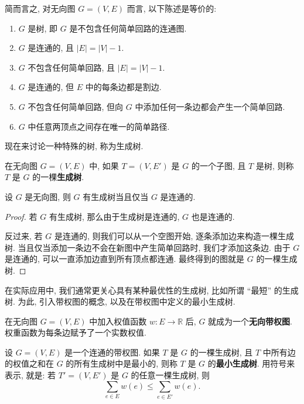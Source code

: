简而言之, 对无向图 $G=(V,E)$ 而言, 以下陈述是等价的:
\begin{enumerate}[itemindent=0ex, itemsep=0pt, label=\upshape{(\alph*)}]
    \item $G$ 是树, 即 $G$ 是不包含任何简单回路的连通图.
    \item $G$ 是连通的, 且 $|E|=|V|-1$.
    \item $G$ 不包含任何简单回路, 且 $|E|=|V|-1$.
    \item $G$ 是连通的, 但 $E$ 中的每条边都是割边.
    \item $G$ 不包含任何简单回路, 但向 $G$ 中添加任何一条边都会产生一个简单回路.
    \item $G$ 中任意两顶点之间存在唯一的简单路径.
\end{enumerate}

现在来讨论一种特殊的树, 称为生成树. 

\begin{definition}[生成树]
    在无向图 $G=(V,E)$ 中, 如果 $T=(V,E')$ 是 $G$ 的一个子图, 且 $T$ 是树, 则称 $T$ 是 $G$ 的一棵\textbf{生成树}.
\end{definition}

\begin{theorem}
    设 $G$ 是无向图, 则 $G$ 有生成树当且仅当 $G$ 是连通的.  
\end{theorem}

\begin{proof}
    若 $G$ 有生成树, 那么由于生成树是连通的, $G$ 也是连通的.

    反过来, 若 $G$ 是连通的, 则我们可以从一个空图开始, 逐条添加边来构造一棵生成树. 当且仅当添加一条边不会在新图中产生简单回路时, 我们才添加这条边. 由于 $G$ 是连通的, 可以一直添加边直到所有顶点都连通. 最终得到的图就是 $G$ 的一棵生成树.
\end{proof}

在实际应用中, 我们通常更关心具有某种最优性的生成树, 比如所谓 ``最短'' 的生成树. 为此, 引入带权图的概念, 以及在带权图中定义的最小生成树.

\begin{definition}[无向带权图]
    在无向图 $G=(V,E)$ 中加入权值函数 $w\colon E\to\mathbb{R}$ 后, $G$ 就成为一个\textbf{无向带权图}. 权重函数为每条边赋予了一个实数权值. 
\end{definition}

\begin{definition}[最小生成树]
    设 $G=(V,E)$ 是一个连通的带权图. 如果 $T$ 是 $G$ 的一棵生成树, 且 $T$ 中所有边的权值之和在 $G$ 的所有生成树中是最小的, 则称 $T$ 是 $G$ 的\textbf{最小生成树}. 用符号来表示, 就是: 若 $T'=(V,E')$ 是 $G$ 的任意一棵生成树, 则 \[\sum_{e\in E}w(e)\leq \sum_{e\in E'}w(e).\]
\end{definition}


